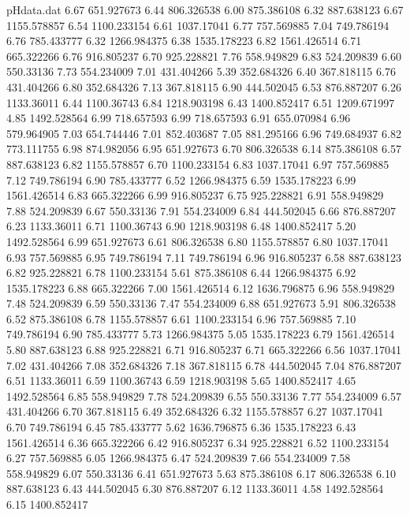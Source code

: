 \begin{filecontents}{pHdata.dat}
6.67 	651.927673
6.44 	806.326538
6.00 	875.386108
6.32 	887.638123
6.67 	1155.578857
6.54 	1100.233154
6.61 	1037.17041
6.77 	757.569885
7.04 	749.786194
6.76 	785.433777
6.32 	1266.984375
6.38 	1535.178223
6.82 	1561.426514
6.71 	665.322266
6.76 	916.805237
6.70 	925.228821
7.76 	558.949829
6.83 	524.209839
6.60 	550.33136
7.73 	554.234009
7.01 	431.404266
5.39 	352.684326
6.40 	367.818115
6.76 	431.404266
6.80 	352.684326
7.13 	367.818115
6.90 	444.502045
6.53 	876.887207
6.26 	1133.36011
6.44 	1100.36743
6.84 	1218.903198
6.43 	1400.852417
6.51 	1209.671997
4.85 	1492.528564
6.99 	718.657593
6.99 	718.657593
6.91 	655.070984
6.96 	579.964905
7.03 	654.744446
7.01 	852.403687
7.05 	881.295166
6.96 	749.684937
6.82 	773.111755
6.98 	874.982056
6.95 	651.927673
6.70 	806.326538
6.14 	875.386108
6.57 	887.638123
6.82 	1155.578857
6.70 	1100.233154
6.83 	1037.17041
6.97 	757.569885
7.12 	749.786194
6.90 	785.433777
6.52 	1266.984375
6.59 	1535.178223
6.99 	1561.426514
6.83 	665.322266
6.99 	916.805237
6.75 	925.228821
6.91 	558.949829
7.88 	524.209839
6.67 	550.33136
7.91 	554.234009
6.84 	444.502045
6.66 	876.887207
6.23 	1133.36011
6.71 	1100.36743
6.90 	1218.903198
6.48 	1400.852417
5.20 	1492.528564
6.99 	651.927673
6.61 	806.326538
6.80 	1155.578857
6.80 	1037.17041
6.93 	757.569885
6.95 	749.786194
7.11 	749.786194
6.96 	916.805237
6.58 	887.638123
6.82 	925.228821
6.78 	1100.233154
5.61 	875.386108
6.44 	1266.984375
6.92 	1535.178223
6.88 	665.322266
7.00 	1561.426514
6.12 	1636.796875
6.96 	558.949829
7.48 	524.209839
6.59 	550.33136
7.47 	554.234009
6.88 	651.927673
5.91 	806.326538
6.52 	875.386108
6.78 	1155.578857
6.61 	1100.233154
6.96 	757.569885
7.10 	749.786194
6.90 	785.433777
5.73 	1266.984375
5.05 	1535.178223
6.79 	1561.426514
5.80 	887.638123
6.88 	925.228821
6.71 	916.805237
6.71 	665.322266
6.56 	1037.17041
7.02 	431.404266
7.08 	352.684326
7.18 	367.818115
6.78 	444.502045
7.04 	876.887207
6.51 	1133.36011
6.59 	1100.36743
6.59 	1218.903198
5.65 	1400.852417
4.65 	1492.528564
6.85 	558.949829
7.78 	524.209839
6.55 	550.33136
7.77 	554.234009
6.57 	431.404266
6.70 	367.818115
6.49 	352.684326
6.32 	1155.578857
6.27 	1037.17041
6.70 	749.786194
6.45 	785.433777
5.62 	1636.796875
6.36 	1535.178223
6.43 	1561.426514
6.36 	665.322266
6.42 	916.805237
6.34 	925.228821
6.52 	1100.233154
6.27 	757.569885
6.05 	1266.984375
6.47 	524.209839
7.66 	554.234009
7.58 	558.949829
6.07 	550.33136
6.41 	651.927673
5.63 	875.386108
6.17 	806.326538
6.10 	887.638123
6.43 	444.502045
6.30 	876.887207
6.12 	1133.36011
4.58 	1492.528564
6.15 	1400.852417

\end{filecontents}
